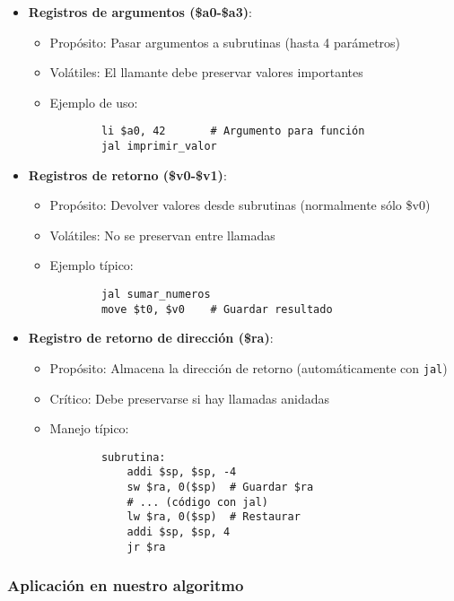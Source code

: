 \documentclass{article}
\begin{document}
\begin{itemize}
    \item \textbf{Registros de argumentos (\$a0-\$a3)}:
    \begin{itemize}
        \item Propósito: Pasar argumentos a subrutinas (hasta 4 parámetros)
        \item Volátiles: El llamante debe preservar valores importantes
        \item Ejemplo de uso: 
        \begin{verbatim}
        li $a0, 42       # Argumento para función
        jal imprimir_valor
        \end{verbatim}
    \end{itemize}
    
    \item \textbf{Registros de retorno (\$v0-\$v1)}:
    \begin{itemize}
        \item Propósito: Devolver valores desde subrutinas (normalmente sólo \$v0)
        \item Volátiles: No se preservan entre llamadas
        \item Ejemplo típico:
        \begin{verbatim}
        jal sumar_numeros
        move $t0, $v0    # Guardar resultado
        \end{verbatim}
    \end{itemize}
    
    \item \textbf{Registro de retorno de dirección (\$ra)}:
    \begin{itemize}
        \item Propósito: Almacena la dirección de retorno (automáticamente con \texttt{jal})
        \item Crítico: Debe preservarse si hay llamadas anidadas
        \item Manejo típico:
        \begin{verbatim}
        subrutina:
            addi $sp, $sp, -4
            sw $ra, 0($sp)  # Guardar $ra
            # ... (código con jal)
            lw $ra, 0($sp)  # Restaurar
            addi $sp, $sp, 4
            jr $ra
        \end{verbatim}
    \end{itemize}
\end{itemize}

\subsubsection*{Aplicación en nuestro algoritmo}
\end{document}
